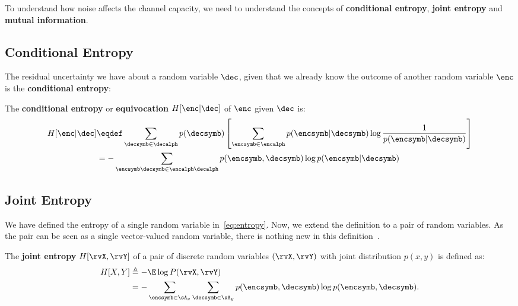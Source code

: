  To understand how noise affects the channel capacity, we need to understand the concepts of \textbf{conditional entropy}, \textbf{joint entropy} and \textbf{mutual information}.
\subsection{Conditional Entropy} The residual uncertainty we have about a random variable \(\dec\), given that we already know the outcome of another random variable \(\enc\) is the \textbf{conditional entropy}:
\begin{definition}
	The \textbf{conditional entropy} or \textbf{equivocation} \(H[\enc|\dec]\) of \(\enc\) given \(\dec\) is:
	\begin{align}
		H[\enc|\dec] &\eqdef \sum_{\decsymb \in \decalph} p(\decsymb) \left[ \sum_{\encsymb \in \encalph} p(\encsymb|\decsymb) \log \frac{1}{p(\encsymb|\decsymb)}\right]\\
		&=- \sum_{\encsymb\decsymb \in \encalph\decalph} p(\encsymb,\decsymb) \log p(\encsymb|\decsymb)
	\end{align}
\end{definition}
\subsection{Joint Entropy}
We have defined the entropy of a single random variable in~\eqref{eq:entropy}. Now, we extend the definition to a pair of random variables. As the pair can be seen as a single vector-valued random variable, there is nothing new in this definition~\cite[p.15]{cover:2006}.
\begin{definition}
	The \textbf{joint entropy} \(H[\rvX, \rvY]\) of a pair of discrete random variables \((\rvX, \rvY)\) with joint distribution \(p (x, y)\) is defined as:
	\begin{align}
		H [X,Y] &\triangleq -\E \log P(\rvX, \rvY) \\
		&= - \sum_{\encsymb \in \sA_x} \sum_{\decsymb \in \sA_y} p(\encsymb,\decsymb) \log p(\encsymb,\decsymb).
	\label{eq:joint_entropy} \end{align}
\end{definition}
